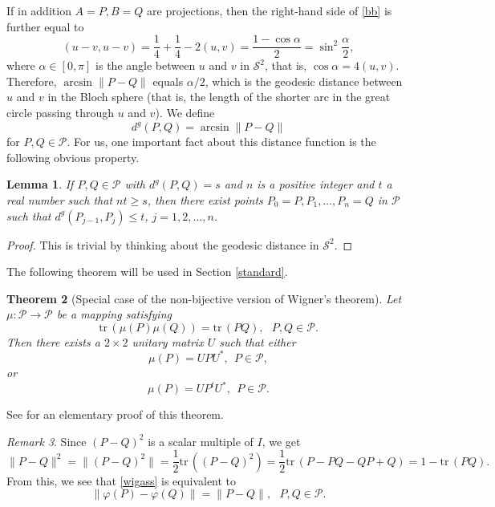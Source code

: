 \documentclass[10pt,a4paper]{amsart}
\providecommand{\index}[1]{}
\newcommand\cP{{\mathcal{P}}}
\newtheorem{theorem}{Theorem}[section]
\newtheorem{lemma}[theorem]{Lemma}
\theoremstyle{definition}
\theoremstyle{remark}
\newtheorem{remark}[theorem]{Remark}
\numberwithin{subsection}{section}
\numberwithin{equation}{section}
\begin{document}
If in addition $A=P, B=Q$ are projections, then the right-hand side of \eqref{bb} is further equal to
\[
 ( u-v, u-v ) = \frac{1}{4} + \frac{1}{4} - 2 ( u,v ) = \frac{1- \cos \alpha}{2}
= \sin^2 \frac{\alpha}{2},
\]
where $\alpha\in [0,\pi]$ is the angle between $u$ and $v$ in $\mathcal{S}^2$, that is, $\cos \alpha = 4 ( u , v )$.
Therefore, $\arcsin \| P - Q \|$ equals $\alpha/2$, which is the geodesic distance between $u$ and $v$ in the Bloch sphere (that is, the length of the shorter arc in the great circle passing through $u$ and $v$). 
We define \index{$d^g$} 
\begin{equation}\label{sooce}
d^g (P,Q) =\arcsin \| P - Q \|
\end{equation}
for $P, Q\in \cP$. 
For us, one important fact about this distance function is the following obvious property. 

\begin{lemma}\label{P}
If $P,Q \in \cP$ with $d^g (P,Q) = s$ and $n$ is a positive integer and $t$ a real number such that $nt \ge s$, then there exist points $P_0 = P, P_1, \ldots, P_n = Q$ in $\cP$ such that $d^g(P_{j-1}, P_j ) \le t$, $j= 1,2,\ldots, n$.
\end{lemma}
\begin{proof}
This is trivial by thinking about the geodesic distance in $\mathcal{S}^2$.
\end{proof}

The following theorem will be used in Section \ref{standard}.
\begin{theorem}[Special case of the non-bijective version of Wigner's theorem]\index{Wigner's theorem}\label{wigner}
Let $\mu \colon \mathcal{P} \to \mathcal{P}$ be a mapping satisfying
\begin{equation}\label{wigass}
\mathrm{tr}\, (\mu (P) \mu (Q) ) = \mathrm{tr}\, (PQ), \ \ \ P,Q \in \mathcal{P}.
\end{equation}
Then there exists a $2 \times 2$ unitary matrix $U$ such that either 
\[
\mu (P) = UPU^\ast,\ \ P \in \mathcal{P},
\]
or 
\[
\mu (P) = UP^tU^\ast,\ \ P \in \mathcal{P}.
\] 
\end{theorem}

See {\cite{Geh}} for an elementary proof of this theorem.

\begin{remark}\label{wignerremark}
Since $(P-Q)^2$ is a scalar multiple of $I$, we get 
\[
\| P - Q \|^2 =\| (P - Q)^2 \|= \frac{1}{2}\mathrm{tr}\,\left( (P-Q)^2\right) = \frac{1}{2}\mathrm{tr}\, (P-PQ-QP+Q) =1-\mathrm{tr}\,(PQ).
\]
From this, we see that \eqref{wigass} is equivalent to 
\[
\| \varphi (P) - \varphi (Q) \| = \| P - Q \|, \ \ \ P,Q \in \mathcal{P}.
\]
\end{remark}
\end{document}
